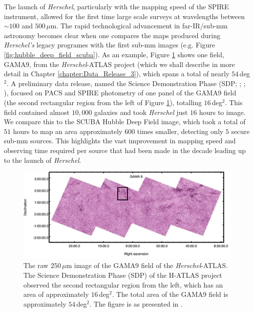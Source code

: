 The launch of \textit{Herschel}, particularly with the mapping speed of the SPIRE instrument, allowed for the first time large scale surveys at wavelengths between $\sim 100$ and $500\,\mu$m. The rapid technological advancement in far-IR/sub-mm astronomy becomes clear when one compares the maps produced during \textit{Herschel's} legacy programes with the first sub-mm images (e.g. Figure \ref{fig:hubble_deep_field_scuba}). As an example, Figure \ref{fig:gama9} shows one field, GAMA9, from the \textit{Herschel}-ATLAS project (which we shall describe in more detail in Chapter \ref{chapter:Data_Release_3}), which spans a total of nearly $54\,$deg$^2$. A preliminary data release, named the Science Demonstration Phase (SDP; \citealt{Ibar_2010}; \citealt{Rigby_2011}; \citealt{Pascale_2011}), focused on PACS and SPIRE photometry of one panel of the GAMA9 field (the second rectangular region from the left of Figure \ref{fig:gama9}), totalling $16\,$deg$^2$. This field contained almost $10,000$ galaxies and took \textit{Herschel} just $16$ hours to image. We compare this to the SCUBA Hubble Deep Field image, which took a total of $51$ hours to map an area approximately $600$ times smaller, detecting only $5$ secure sub-mm sources. This highlights the vast improvement in mapping speed and observing time required per source that had been made in the decade leading up to the launch of \textit{Herschel}.

\begin{figure}
    \centering
	\includegraphics[width=0.9\columnwidth]{Figures/GAMA9.pdf}
	\caption{The raw $250\,\mu$m image of the GAMA9 field of the \textit{Herschel}-ATLAS. The Science Demonstration Phase (SDP) of the H-ATLAS project observed the second rectangular region from the left, which has an area of approximately $16\,$deg$^2$. The total area of the GAMA9 field is approximately $54\,$deg$^2$. The figure is as presented in \citealt{Valiante_2016}.}
	\label{fig:gama9}
\end{figure}

